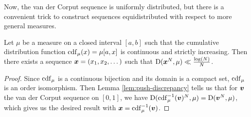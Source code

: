 Now, the van der Corput sequence is uniformly distributed, but there is a 
convenient trick to construct sequences equidistributed with respect to more 
general measures. 

\begin{theorem}\label{thm:van-der-corput}
Let $\mu$ be a measure on a closed interval $[a,b]$ such that the cumulative 
distribution function $\operatorname{cdf}_\mu(x) = \mu[a,x]$ is continuous and strictly 
increasing. Then there exists a sequence ${\boldsymbol x}=(x_1,x_2,\dots)$ such that 
$\operatorname{D}({\boldsymbol x}^N,\mu) \ll \frac{\log(N)}{N}$. 
\end{theorem}
\begin{proof}
Since $\operatorname{cdf}_\mu$ is a continuous bijection and its domain is a compact set, 
$\operatorname{cdf}_\mu$ is an order isomorphism. Then Lemma \ref{lem:push-discrepancy} tells 
us that for ${\boldsymbol v}$ the van der Corput sequence on $[0,1]$, we have 
$\operatorname{D}(\operatorname{cdf}_\mu^{-1}({\boldsymbol v})^N, \mu) = \operatorname{D}({\boldsymbol v}^N,\mu)$, which gives us the 
desired result with ${\boldsymbol x} = \operatorname{cdf}_\mu^{-1}({\boldsymbol v})$. 
\end{proof}

